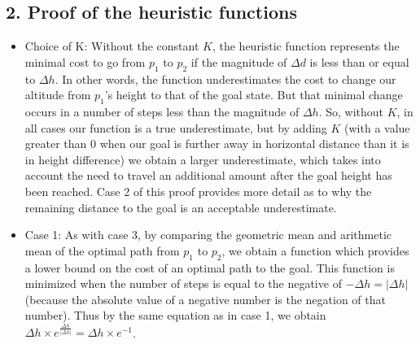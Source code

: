 \documentclass[11pt]{article}  %
\begin{document}
\subsection*{2. Proof of the heuristic functions}
\begin{itemize}
\item Choice of K: Without the constant $K$, the heuristic function represents the minimal cost to go from $p_1$ to $p_2$ if the magnitude of $\Delta d$ is less than or equal to $\Delta h$. In other words, the function underestimates the cost to change our altitude from $p_1$'s height to that of the goal state. But that minimal change occurs in a number of steps less than the magnitude of $\Delta h$. So, without $K$, in all cases our function is a true underestimate, but by adding $K$ (with a value greater than $0$ when our goal is further away in horizontal distance than it is in height difference) we obtain a larger underestimate, which takes into account the need to travel an additional amount after the goal height has been reached. Case 2 of this proof provides more detail as to why the remaining distance to the goal is an acceptable underestimate.
\item Case 1: As with case 3, by comparing the geometric mean and arithmetic mean of the optimal path from $p_1$ to $p_2$, we obtain a function which provides a lower bound on the cost of an optimal path to the goal. This function is minimized when the number of steps is equal to the negative of $-\Delta h = |\Delta h|$ (because the absolute value of a negative number is the negation of that number). Thus by the same equation as in case 1, we obtain $\Delta h \times e^\frac{\Delta h}{|\Delta h|} = \Delta h \times e^{-1}$.


\end{itemize}
\end{document}
